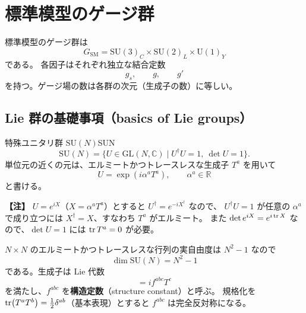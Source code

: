\documentclass[uplatex,dvipdfmx,a4paper,11pt,openany]{jsbook}
\newcommand{\term}[2]{\textbf{#1}（#2）}
\newenvironment{note}{\vspace{1ex}\par\footnotesize\noindent\textbf{【注】}}{\par\vspace{1ex}}
\numberwithin{equation}{chapter}
\theoremstyle{definition}
\theoremstyle{plain}
\theoremstyle{remark}
\newcommand{\SM}{\mathrm{SM}}
\newcommand{\SU}{\mathrm{SU}}
\newcommand{\U}{\mathrm{U}}
\begin{document}
\section{標準模型のゲージ群}
標準模型のゲージ群は
\begin{equation}
\boxed{
G_{\SM}=\SU(3)_C\times\SU(2)_L\times\U(1)_Y
}
\end{equation}
である。
各因子はそれぞれ独立な結合定数
\begin{equation}
g_s,\qquad g,\qquad g'
\end{equation}
を持つ。ゲージ場の数は各群の次元（生成子の数）に等しい。
\subsection{Lie 群の基礎事項（basics of Lie groups）}
\begin{mydef}{特殊ユニタリ群 $\SU(N)$}{SUN}
\begin{equation}
\SU(N)=\{U\in\mathrm{GL}(N,\mathbb{C})\mid U^\dagger U=1,\ \det U=1\}.
\end{equation}
単位元の近くの元は、エルミートかつトレースレスな生成子 $T^a$ を用いて
\begin{equation}
U=\exp\left(i\alpha^aT^a\right),\qquad \alpha^a\in\mathbb{R}
\end{equation}
と書ける。
\end{mydef}
\begin{note}
$U=e^{iX}$（$X=\alpha^aT^a$）とすると $U^\dagger=e^{-iX^\dagger}$ なので、
$U^\dagger U=1$ が任意の $\alpha^a$ で成り立つには $X^\dagger=X$、すなわち $T^a$ がエルミート。
また $\det e^{iX}=e^{i\tr X}$ なので、$\det U=1$ には $\tr T^a=0$ が必要。
\end{note}
$N\times N$ のエルミートかつトレースレスな行列の実自由度は $N^2-1$ なので
\begin{equation}
\dim\SU(N)=N^2-1
\end{equation}
である。生成子は Lie 代数
\begin{equation}
[T^a,T^b]=if^{abc}T^c
\end{equation}
を満たし、$f^{abc}$ を\term{構造定数}{structure constant}と呼ぶ。
規格化を $\tr(T^aT^b)=\frac12\delta^{ab}$（基本表現）とすると $f^{abc}$ は完全反対称になる。
\end{document}
